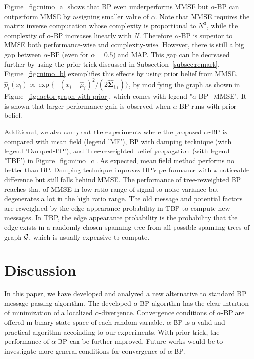 Figure~\ref{fig:mimo_a} shows that BP even underperforms MMSE but $\alpha$-BP can outperform MMSE by assigning smaller value of $\alpha$.
Note that MMSE requires the matrix inverse computation whose complexity is proportional to $N^3$, while the complexity of $\alpha$-BP increases linearly with $N$. Therefore $\alpha$-BP is superior to MMSE both performance-wise and complexity-wise.  
However, there is still a big gap between $\alpha$-BP (even for $\alpha=0.5$) and MAP. This gap can be decreased further by using the prior trick discussed in Subsection~\ref{subsec:remark}. Figure~\ref{fig:mimo_b} exemplifies this effects by using prior belief from MMSE, $\hat{p}_i(x_i)\propto \exp\{-(x_i-\hat{\mu}_i)^2/(2\hat{\bm{\Sigma}}_{i,i})\}$, by modifying the graph as shown in Figure~\ref{fig:factor-graph-with-prior}, which comes with legend "$\alpha$-BP$+$MMSE". It is shown that larger performance gain is observed when $\alpha$-BP runs with prior belief.

Additional, we also carry out the experiments where the proposed $\alpha$-BP is compared with mean field (legend 'MF'), BP with damping technique \cite{Pretti2005damping} (with legend 'Damped-BP'), and Tree-reweighted belief propagation \cite{wainwright2008graphical} (with legend 'TBP') in Figure~\ref{fig:mimo_c}. As expected, mean field method performs no better than BP. Damping technique improves BP's performance with a noticeable difference but still falls behind MMSE. The performance of tree-reweighted BP reaches that of MMSE in low ratio range of signal-to-noise variance but degenerates a lot in the high ratio range. The old message and potential factors are reweighted by the edge appearance probability in TBP to compute new messages. In TBP, the edge appearance probability is the probability that the edge exists in a randomly chosen spanning tree from all possible spanning trees of graph $\mathcal{G}$, which is usually expensive to compute.

\section{Discussion}
In this paper, we have developed and analyzed a new alternative to standard BP message passing algorithm. The developed $\alpha$-BP algorithm has the clear intuition of minimization of a localized $\alpha$-divergence. Convergence conditions of $\alpha$-BP are offered in binary state space of each random variable. $\alpha$-BP is a valid and practical algorithm accoinding to our experiments. With prior trick, the performance of $\alpha$-BP can be further improved. Future works would be to investigate more general conditions for convergence of $\alpha$-BP. 


